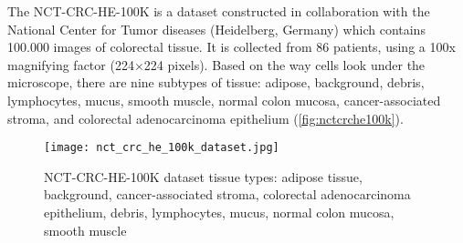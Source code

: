 The NCT-CRC-HE-100K \cite{kather_jakob_nikolas_2018_1214456} is a dataset constructed in collaboration with the National Center for Tumor diseases (Heidelberg, Germany) which contains 100.000 images of colorectal tissue. It is collected from 86 patients, using a 100x magnifying factor (224$\times$224 pixels). Based on the way cells look under the microscope, there are nine subtypes of tissue: adipose, background, debris, lymphocytes, mucus, smooth muscle, normal colon mucosa, cancer-associated stroma, and colorectal adenocarcinoma epithelium (\textcolor{red}{\autoref{fig:nctcrche100k}}).

\begin{figure}[h]
	\centering
	\texttt{[image: nct\_crc\_he\_100k\_dataset.jpg]}
	\caption{NCT-CRC-HE-100K dataset tissue types: adipose tissue, background, cancer-associated stroma, colorectal adenocarcinoma epithelium, debris, lymphocytes, mucus, normal colon mucosa, smooth muscle}
	\label{fig:nctcrche100k}
\end{figure}
